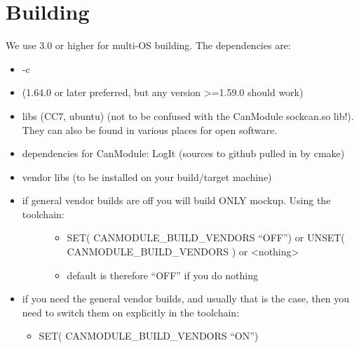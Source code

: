 \documentclass[letterpaper,10pt,english]{sphinxmanual}
\begin{document}
\chapter{Building}
\label{\detokenize{building:building}}\label{\detokenize{building::doc}}
We use  3.0 or higher for multi-OS building.
The dependencies are:
\begin{itemize}
\item {} 
-c

\item {} 
 (1.64.0 or later preferred, but any version \textgreater{}=1.59.0 should work)

\item {} 
 libs (CC7, ubuntu) (not to be confused with the CanModule sockcan.so lib!).
They can also be found in various places for open software.

\item {} 
dependencies for CanModule: LogIt (sources to github pulled in by cmake)

\item {} 
vendor libs (to be installed on your build/target machine)

\item {} \begin{description}
\item[{if general vendor builds are off you will build ONLY mockup. Using the toolchain:}] \leavevmode\begin{itemize}
\item {} 
SET( CANMODULE\_BUILD\_VENDORS “OFF”) or UNSET( CANMODULE\_BUILD\_VENDORS ) or \textless{}nothing\textgreater{}

\item {} 
default is therefore “OFF” if you do nothing

\end{itemize}

\end{description}

\item {} 
if you need the general vendor builds, and usually that is the case, then you need to
switch them on explicitly in the toolchain:
\begin{itemize}
\item {} 
SET( CANMODULE\_BUILD\_VENDORS “ON”)

\end{itemize}


\end{itemize}
\end{document}
